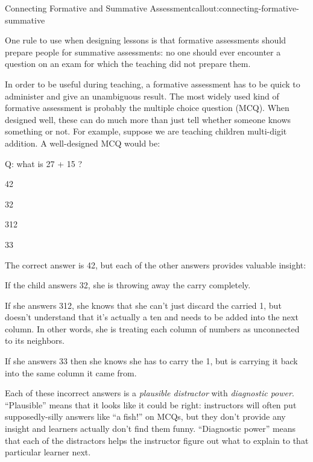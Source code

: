 \begin{callout}{Connecting Formative and Summative Assessment}{callout:connecting-formative-summative}

One rule to use when designing lessons is that formative assessments
should prepare people for summative assessments: no one should ever
encounter a question on an exam for which the teaching did not prepare
them.

\end{callout}

In order to be useful during teaching, a formative assessment has to
be quick to administer and give an unambiguous result. The most widely
used kind of formative assessment is probably the multiple choice
question (MCQ). When designed well, these can do much more than just
tell whether someone knows something or not. For example, suppose we
are teaching children multi-digit addition. A well-designed MCQ would
be:

\begin{example}
\noindent
Q: what is 27 + 15 ?
\begin{genumerate}
\item 42
\item 32
\item 312
\item 33
\end{genumerate}
\end{example}

The correct answer is 42, but each of the other answers provides
valuable insight:

\begin{gitemize}

\item
  If the child answers 32, she is throwing away the carry completely.

\item
  If she answers 312, she knows that she can't just discard the
  carried 1, but doesn't understand that it's actually a ten and needs
  to be added into the next column. In other words, she is treating
  each column of numbers as unconnected to its neighbors.

\item
  If she answers 33 then she knows she has to carry the 1, but is
  carrying it back into the same column it came from.

\end{gitemize}

Each of these incorrect answers is a \emph{plausible distractor} with
\emph{diagnostic power}.   ``Plausible'' means that it looks like it
could be right: instructors will often put supposedly-silly answers
like ``a fish!'' on MCQs, but they don't provide any insight and
learners actually don't find them funny. ``Diagnostic power'' means
that each of the distractors helps the instructor figure out what to
explain to that particular learner next.

